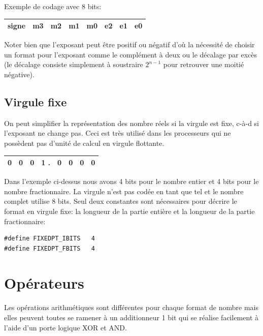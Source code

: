 Exemple de codage avec 8 bits:
\begin{center}
{\selectfont
\begin{tabular}{|c|c|c|c|c|c|c|c|}
\hline
signe & m3 & m2 & m1 & m0 & e2 & e1 & e0 \\
\hline
\end{tabular}
}
\end{center}

Noter bien que l'exposant peut être positif ou négatif d'où la nécessité de choisir un format pour l'exposant comme le complément à deux ou le décalage par excès (le décalage consiste simplement à soustraire $2^{n-1}$ pour retrouver une moitié négative).

\subsection{Virgule fixe}
On peut simplifier la représentation des nombre réels si la virgule est fixe, c-à-d si l'exposant ne change pas. Ceci est très utilisé dans les processeurs qui ne possèdent pas d'unité de calcul en virgule flottante.

\begin{center}
{\selectfont
\begin{tabular}{|c|c|c|c c|c|c|c|}
\hline
0 & 0 & 0 & 1 . & 0 & 0 & 0 & 0 \\
\hline
\end{tabular}
}
\end{center}

Dans l'exemple ci-dessus nous avons 4 bits pour le nombre entier et 4 bits pour le nombre fractionnaire. La virgule n'est pas codée en tant que tel et le nombre complet utilise 8 bits. Seul deux constantes sont nécessaires pour décrire le format en virgule fixe: la longueur de la partie entière et la longueur de la partie fractionnaire:

\lstset{style=customc}
\begin{lstlisting}
#define FIXEDPT_IBITS	4
#define FIXEDPT_FBITS	4
\end{lstlisting}

\section{Opérateurs}
Les opérations arithmétiques sont différentes pour chaque format de nombre mais elles peuvent toutes se ramener à un additionneur 1 bit qui se réalise facilement à l'aide d'un porte logique XOR et AND. 

